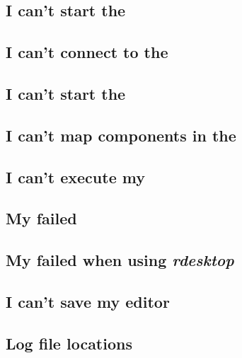 



\subsection{I can't start the \gdagent}
\label{troublestartserver}


\subsection{I can't connect to the \gdagent}
\label{troubleconnectserver}


\subsection{I can't start the \gdaut{}}
\label{troublestartaut}


\subsection{I can't map components in the \gdomm}
\label{troubleobjectmapping}


\subsection{I can't execute my \gdsuite{}}
\label{troubleexecute}


\subsection{My \gdsuite{} failed}
\label{troublefailed}


\subsection{My \gdsuite{} failed when using \emph{rdesktop}}
\label{troublerdesktop}


\subsection{I can't save my editor}
\label{troublelocked}


\subsection{Log file locations}

